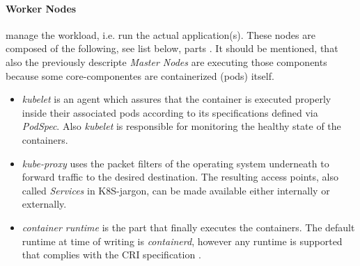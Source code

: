 \documentclass[MSC,Master,english]{twbook}%
\begin{document}
\paragraph{Worker Nodes} manage the workload, i.e. run the actual application(s). These nodes are composed of the following, see list below, parts \cite{k8scomp}. It should be mentioned, that also the previously descripte \textit{Master Nodes} are executing those components because some core-componentes are containerized (pods) itself. 
\begin{itemize}
    \item \textit{kubelet} is an agent which assures that the container is executed properly inside their associated pods according to its specifications defined via \textit{PodSpec}. Also \textit{kubelet} is responsible for monitoring the healthy state of the containers.
    \item \textit{kube-proxy} uses the packet filters of the operating system underneath to forward traffic to the desired destination. The resulting access points, also called \textit{Services} in \ac{K8S}-jargon, can be made available either internally or externally.
    \item \textit{container runtime} is the part that finally executes the containers. The default runtime at time of writing is \textit{containerd}, however any runtime is supported that complies with the CRI specification \cite{cri-runtime}.
\end{itemize}
\end{document}
